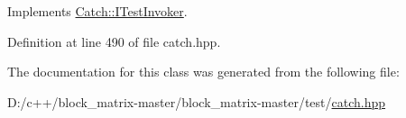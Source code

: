 Implements \mbox{\hyperlink{struct_catch_1_1_i_test_invoker_a6fcd5c5b67d6d5ade6491ff33411ca7f}{Catch\+::\+I\+Test\+Invoker}}.



Definition at line 490 of file catch.\+hpp.



The documentation for this class was generated from the following file\+:\begin{DoxyCompactItemize}
\item 
D\+:/c++/block\+\_\+matrix-\/master/block\+\_\+matrix-\/master/test/\mbox{\hyperlink{catch_8hpp}{catch.\+hpp}}\end{DoxyCompactItemize}
